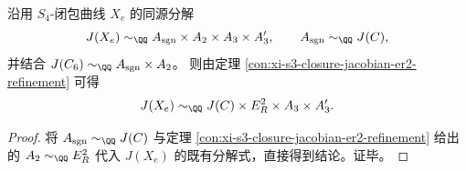 \begin{corollary}\label{cor:xi-s4-jacobian-er2-elliptification}
沿用 \(S_4\)-闭包曲线 \(X_e\) 的同源分解
\[
J(X_e)\sim_{\QQ}A_{\mathrm{sgn}}\times A_2\times A_3\times A_3',
\qquad
A_{\mathrm{sgn}}\sim_{\QQ}J(C),
\]
并结合 \(J(C_6)\sim_{\QQ}A_{\mathrm{sgn}}\times A_2\)。
则由定理 \ref{con:xi-s3-closure-jacobian-er2-refinement} 可得
\[
J(X_e)\sim_{\QQ}J(C)\times E_R^2\times A_3\times A_3'.
\]
\end{corollary}
\begin{proof}
将 \(A_{\mathrm{sgn}}\sim_{\QQ}J(C)\) 与定理 \ref{con:xi-s3-closure-jacobian-er2-refinement} 给出的
\(
A_2\sim_{\QQ}E_R^2
\)
代入 \(J(X_e)\) 的既有分解式，直接得到结论。证毕。
\end{proof}








\endinput
